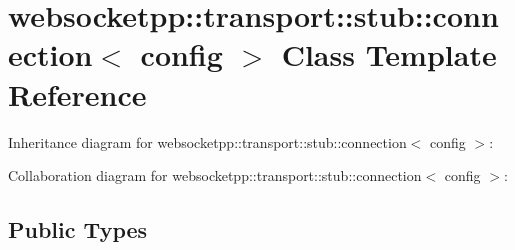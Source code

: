 \hypertarget{classwebsocketpp_1_1transport_1_1stub_1_1connection}{}\section{websocketpp\+:\+:transport\+:\+:stub\+:\+:connection$<$ config $>$ Class Template Reference}
\label{classwebsocketpp_1_1transport_1_1stub_1_1connection}


Inheritance diagram for websocketpp\+:\+:transport\+:\+:stub\+:\+:connection$<$ config $>$\+:


Collaboration diagram for websocketpp\+:\+:transport\+:\+:stub\+:\+:connection$<$ config $>$\+:
\subsection*{Public Types}
